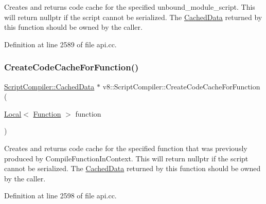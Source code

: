 Creates and returns code cache for the specified unbound\+\_\+module\+\_\+script. This will return nullptr if the script cannot be serialized. The \mbox{\hyperlink{structv8_1_1ScriptCompiler_1_1CachedData}{Cached\+Data}} returned by this function should be owned by the caller. 

Definition at line 2589 of file api.\+cc.

\mbox{\label{classv8_1_1ScriptCompiler_a1b6b3a5c9cfcd56c8ad359f6befd6e1a}} 
\subsubsection{\texorpdfstring{Create\+Code\+Cache\+For\+Function()}{CreateCodeCacheForFunction()}}
{\footnotesize\ttfamily \mbox{\hyperlink{structv8_1_1ScriptCompiler_1_1CachedData}{Script\+Compiler\+::\+Cached\+Data}} $\ast$ v8\+::\+Script\+Compiler\+::\+Create\+Code\+Cache\+For\+Function (\begin{DoxyParamCaption}\item[{\mbox{\hyperlink{classv8_1_1Local}{Local}}$<$ \mbox{\hyperlink{classv8_1_1Function}{Function}} $>$}]{function }\end{DoxyParamCaption})\hspace{0.3cm}{\ttfamily [static]}}

Creates and returns code cache for the specified function that was previously produced by Compile\+Function\+In\+Context. This will return nullptr if the script cannot be serialized. The \mbox{\hyperlink{structv8_1_1ScriptCompiler_1_1CachedData}{Cached\+Data}} returned by this function should be owned by the caller. 

Definition at line 2598 of file api.\+cc.

\mbox{\label{classv8_1_1ScriptCompiler_a556e64fe39f5bcafd9f4c04957776f60}} 

